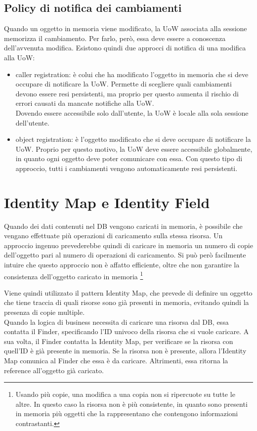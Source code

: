 \subsection{Policy di notifica dei cambiamenti}
Quando un oggetto in memoria viene modificato, la UoW associata alla sessione memorizza il cambiamento. Per farlo, però, essa deve essere a conoscenza dell'avvenuta modifica.
Esistono quindi due approcci di notifica di una modifica alla UoW:
\begin{itemize}
    \item caller registration: è colui che ha modificato l'oggetto in memoria che si deve occupare di notificare la UoW. Permette di scegliere quali cambiamenti devono essere resi persistenti, ma proprio per questo aumenta il rischio di errori causati da mancate notifiche alla UoW.\\
    Dovendo essere accessibile solo dall'utente, la UoW è locale alla sola sessione dell'utente.
    \item object registration: è l'oggetto modificato che si deve occupare di notificare la UoW.
    Proprio per questo motivo, la UoW deve essere accessibile globalmente, in quanto ogni oggetto deve poter comunicare con essa. Con questo tipo di approccio, tutti i cambiamenti vengono automaticamente resi persistenti.
\end{itemize}

\section{Identity Map e Identity Field}
Quando dei dati contenuti nel DB vengono caricati in memoria, è possibile che vengano effettuate più operazioni di caricamento sulla stessa risorsa. Un approccio ingenuo prevederebbe quindi di caricare in memoria un numero di copie dell'oggetto pari al numero di operazioni di caricamento. Si può però facilmente intuire che questo approccio non è affatto efficiente, oltre che non garantire la consistenza dell'oggetto caricato in memoria \footnote{Usando più copie, una modifica a una copia non si ripercuote su tutte le altre. In questo caso la risorsa non è più consistente, in quanto sono presenti in memoria più oggetti che la rappresentano che contengono informazioni contrastanti.}

Viene quindi utilizzato il pattern Identity Map, che prevede di definire un oggetto che tiene traccia di quali risorse sono già presenti in memoria, evitando quindi la presenza di copie multiple.\\
Quando la logica di business necessita di caricare una risorsa dal DB, essa contatta il Finder, specificando l'ID univoco della risorsa che si vuole caricare. A sua volta, il Finder contatta la Identity Map, per verificare se la risorsa con quell'ID è già presente in memoria. Se la risorsa non è presente, allora l'Identity Map comunica al Finder che essa è da caricare. Altrimenti, essa ritorna la reference all'oggetto già caricato.

